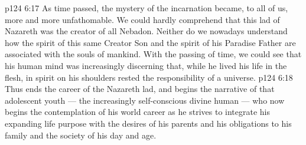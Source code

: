 \vs p124 6:17 As time passed, the mystery of the incarnation became, to all of us, more and more unfathomable. We could hardly comprehend that this lad of Nazareth was the creator of all Nebadon. Neither do we nowadays understand how the spirit of this same Creator Son and the spirit of his Paradise Father are associated with the souls of mankind. With the passing of time, we could see that his human mind was increasingly discerning that, while he lived his life in the flesh, in spirit on his shoulders rested the responsibility of a universe.
\vs p124 6:18 \pc Thus ends the career of the Nazareth lad, and begins the narrative of that adolescent youth --- the increasingly self\hyp{}conscious divine human --- who now begins the contemplation of his world career as he strives to integrate his expanding life purpose with the desires of his parents and his obligations to his family and the society of his day and age.
\quizlink
